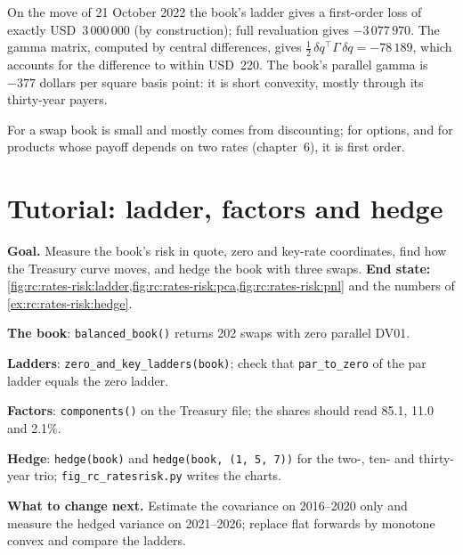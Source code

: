 \begin{example}\label{ex:rc:rates-risk:gamma}
On the move of 21 October 2022 the book's ladder gives a first-order loss of
exactly USD~3\,000\,000 (by construction); full revaluation gives
$-3\,077\,970$. The gamma matrix, computed by central differences, gives
$\tfrac12\,\delta q^\top\Gamma\,\delta q = -78\,189$, which accounts for the
difference to within USD~220. The book's parallel gamma is $-377$ dollars per
square basis point: it is short convexity, mostly through its thirty-year
payers.
\end{example}

For a swap book  is small and mostly comes from discounting; for
options, and for products whose payoff depends on two rates (chapter~6), it is
first order.

\section{Tutorial: ladder, factors and hedge}\label{tut:rc:rates-risk:tutorial}

\begin{tutorial}
\textbf{Goal.} Measure the book's risk in quote, zero and key-rate
coordinates, find how the Treasury curve moves, and hedge the book with three
swaps. \textbf{End state:}
\cref{fig:rc:rates-risk:ladder,fig:rc:rates-risk:pca,fig:rc:rates-risk:pnl} and the
numbers of \cref{ex:rc:rates-risk:hedge}.
\begin{tutsteps}
\item \textbf{The book}: \texttt{balanced\_book()} returns 202 swaps with zero
parallel DV01.
\item \textbf{Ladders}: \texttt{zero\_and\_key\_ladders(book)}; check that
\texttt{par\_to\_zero} of the par ladder equals the zero ladder.
\label{lst:rc:rates-risk:ladder}
\item \textbf{Factors}: \texttt{components()} on the Treasury file; the shares
should read 85.1, 11.0 and 2.1\%.
\item \textbf{Hedge}: \texttt{hedge(book)} and \texttt{hedge(book, (1, 5, 7))}
for the two-, ten- and thirty-year trio; \texttt{fig\_rc\_ratesrisk.py} writes
the charts.
\end{tutsteps}
\textbf{What to change next.} Estimate the covariance on 2016--2020 only and
measure the hedged variance on 2021--2026; replace flat forwards by monotone
convex and compare the ladders.
\end{tutorial}

